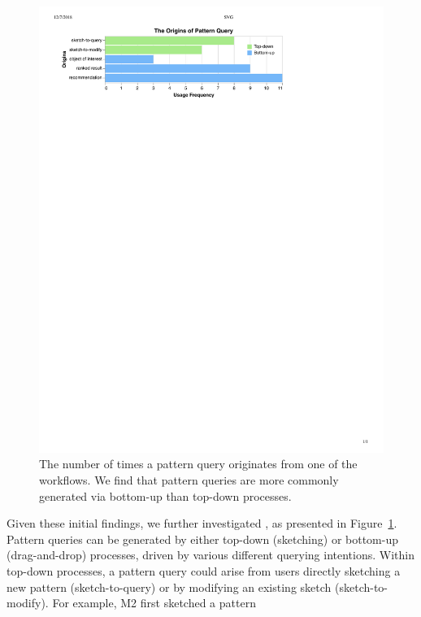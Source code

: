 \begin{figure}[h!]
  \includegraphics[width=\linewidth]{figures/the_origins_of_sketch.pdf}
  \vspace{-5pt}
  \caption{The number of times a pattern query originates from one of the workflows. We find that pattern queries are  more commonly generated via bottom-up than top-down processes.}\label{fig:origins_of_sketch}
  \vspace{-5pt}
\end{figure}
\par Given these initial findings,
we further investigated , as presented in Figure~\ref{fig:origins_of_sketch}.
Pattern queries can be generated by
either top-down (sketching) or
bottom-up (drag-and-drop) processes,
driven by various different querying intentions.
Within top-down processes,
a pattern query could arise
from users directly sketching
a new pattern (sketch-to-query)
or by modifying an existing sketch (sketch-to-modify). For example, M2 first sketched a pattern
